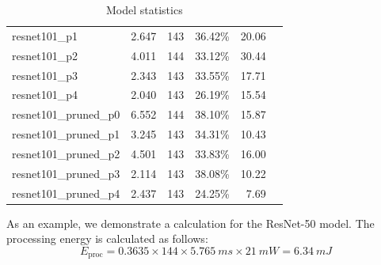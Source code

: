 \begin{table}[]
\begin{tabular}{@{}lrrrrr@{}}
resnet101\_p1           & 2.647                                                           & 143            & 36.42\%            & 20.06                                                             \\
resnet101\_p2           & 4.011                                                           & 144            & 33.12\%            & 30.44                                                             \\
resnet101\_p3           & 2.343                                                           & 143            & 33.55\%            & 17.71                                                             \\
resnet101\_p4           & 2.040                                                           & 143            & 26.19\%            & 15.54                                                             \\
resnet101\_pruned\_p0   & 6.552                                                           & 144            & 38.10\%            & 15.87                                                             \\
resnet101\_pruned\_p1   & 3.245                                                           & 143            & 34.31\%            & 10.43                                                             \\
resnet101\_pruned\_p2   & 4.501                                                           & 143            & 33.83\%            & 16.00                                                             \\
resnet101\_pruned\_p3   & 2.114                                                           & 143            & 38.08\%            & 10.22                                                             \\
resnet101\_pruned\_p4   & 2.437                                                           & 143            & 24.25\%            & 7.69                                                              \\
\bottomrule
\end{tabular}
\caption{Model statistics}
\label{tab:example_models_stats}
\end{table}

As an example, we demonstrate a calculation for the ResNet-50 model.
The processing energy is calculated as follows:
\begin{equation}
    E_\textrm{proc} = 0.3635 \times 144 \times \SI{5.765}{ms} \times \SI{21}{mW} = \SI{6.34}{mJ}
\end{equation}


